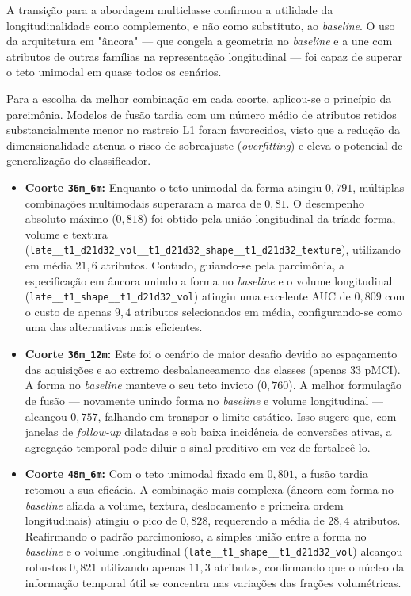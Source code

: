 \documentclass[review]{elsarticle}
\newcommand{\code}[1]{\texttt{#1}}
\begin{document}
A transição para a abordagem multiclasse confirmou a utilidade da longitudinalidade como complemento, e não como substituto, ao \textit{baseline}. O uso da arquitetura em "âncora" --- que congela a geometria no \textit{baseline} e a une com atributos de outras famílias na representação longitudinal --- foi capaz de superar o teto unimodal em quase todos os cenários. 

Para a escolha da melhor combinação em cada coorte, aplicou-se o princípio da parcimônia. Modelos de fusão tardia com um número médio de atributos retidos substancialmente menor no rastreio L1 foram favorecidos, visto que a redução da dimensionalidade atenua o risco de sobreajuste (\emph{overfitting}) e eleva o potencial de generalização do classificador.

\begin{itemize}
	\item \textbf{Coorte \code{36m\_6m}:} Enquanto o teto unimodal da forma atingiu $0,791$, múltiplas combinações multimodais superaram a marca de $0,81$. O desempenho absoluto máximo ($0,818$) foi obtido pela união longitudinal da tríade forma, volume e textura (\code{late\_\_t1\_d21d32\_vol\_\_t1\_d21d32\_shape\_\_t1\_d21d32\_texture}), utilizando em média $21,6$ atributos. Contudo, guiando-se pela parcimônia, a especificação em âncora unindo a forma no \textit{baseline} e o volume longitudinal (\code{late\_\_t1\_shape\_\_t1\_d21d32\_vol}) atingiu uma excelente AUC de $0,809$ com o custo de apenas $9,4$ atributos selecionados em média, configurando-se como uma das alternativas mais eficientes.
	
	\item \textbf{Coorte \code{36m\_12m}:} Este foi o cenário de maior desafio devido ao espaçamento das aquisições e ao extremo desbalanceamento das classes (apenas 33 pMCI). A forma no \textit{baseline} manteve o seu teto invicto ($0,760$). A melhor formulação de fusão --- novamente unindo forma no \textit{baseline} e volume longitudinal --- alcançou $0,757$, falhando em transpor o limite estático. Isso sugere que, com janelas de \textit{follow-up} dilatadas e sob baixa incidência de conversões ativas, a agregação temporal pode diluir o sinal preditivo em vez de fortalecê-lo.
	
	\item \textbf{Coorte \code{48m\_6m}:} Com o teto unimodal fixado em $0,801$, a fusão tardia retomou a sua eficácia. A combinação mais complexa (âncora com forma no \textit{baseline} aliada a volume, textura, deslocamento e primeira ordem longitudinais) atingiu o pico de $0,828$, requerendo a média de $28,4$ atributos. Reafirmando o padrão parcimonioso, a simples união entre a forma no \textit{baseline} e o volume longitudinal (\code{late\_\_t1\_shape\_\_t1\_d21d32\_vol}) alcançou robustos $0,821$ utilizando apenas $11,3$ atributos, confirmando que o núcleo da informação temporal útil se concentra nas variações das frações volumétricas.
	

\end{itemize}
\end{document}
